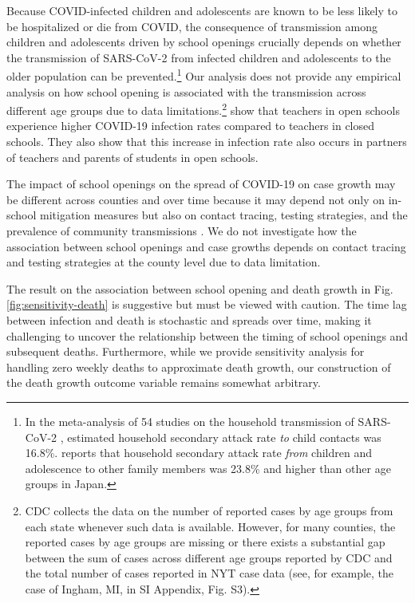 \documentclass[9pt,twocolumn,twoside,lineno]{pnas-new}
\begin{document}
Because COVID-infected children and adolescents are known to be less likely to be hospitalized or die from COVID, the consequence of transmission among children and adolescents driven by school openings crucially depends on whether the transmission of SARS-CoV-2 from infected children and adolescents to the older population can be prevented.\footnote{In the meta-analysis of 54 studies
on the household transmission of SARS-CoV-2 \cite{zachary2020}, estimated household secondary attack rate \textit{to} child contacts was 16.8\%. \cite{miyahara2021} reports that household secondary attack rate \textit{from} children and adolescence to other family members was 23.8\% and higher than other age groups in Japan.}  Our analysis does not provide any empirical analysis on how school opening is associated with the transmission across different age groups due to data limitations.\footnote{CDC collects the data on the number of reported cases by age groups from each state whenever such data is available. However, for many counties, the reported cases by age groups are missing or there exists a substantial gap between the sum of cases across different age groups reported by CDC and the total number of  cases reported in NYT case data (see, for example, the case of Ingham, MI, in  SI Appendix,  Fig. S3).} \cite{vlachos2021} show that teachers in open schools experience higher COVID-19 infection rates compared to teachers in closed schools. They also show that this increase in infection rate also occurs in partners of teachers and parents of students in open schools.

The impact of school openings on the spread of COVID-19 on case growth may be different across counties and over time because it may depend not only on in-school mitigation measures but also on contact tracing,  testing strategies, and the prevalence of community transmissions \citep{Goldhaber-Fiebert2020,ziauddeen2020}.  We do not investigate how the association between school openings and case growths depends on contact tracing and testing strategies at the county level due to data limitation.

The result on the association between school opening and death growth in Fig. \ref{fig:sensitivity-death} is suggestive but must be viewed with caution. The time lag between infection and death is stochastic and spreads over time, making it challenging to uncover the relationship between the timing of school openings and subsequent deaths.  Furthermore, while we provide sensitivity analysis for handling zero weekly deaths to approximate death growth, our construction of the death growth outcome variable remains somewhat arbitrary. %
\end{document}
